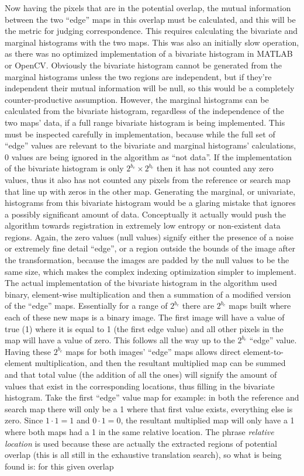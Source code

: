 Now having the pixels that are in the potential overlap, the mutual information between the two ``edge'' maps in this overlap must be calculated, and this will be the metric for judging correspondence. This requires calculating the bivariate and marginal histograms with the two maps. This was also an initially slow operation, as there was no optimized implementation of a bivariate histogram in MATLAB\textsuperscript{\textregistered} or OpenCV. Obviously the bivariate histogram cannot be generated from the marginal histograms unless the two regions are independent, but if they're independent their mutual information will be null, so this would be a completely counter-productive assumption. However, the marginal histograms can be calculated from the bivariate histogram, regardless of the independence of the two maps' data, if a full range bivariate histogram is being implemented. This must be inspected carefully in implementation, because while the full set of ``edge'' values are relevant to the bivariate and marginal histograms' calculations, 0 values are being ignored in the algorithm as ``not data''. If the implementation of the bivariate histogram is only $2^{b_{e}} \times 2^{b_{e}}$ then it has not counted any zero values, thus it also has not counted any pixels from the reference or search map that line up with zeros in the other map. Generating the marginal, or univariate, histograms from this bivariate histogram would be a glaring mistake that ignores a possibly significant amount of data. Conceptually it actually would push the algorithm towards registration in extremely low entropy or non-existent data regions. Again, the zero values (null values) signify either the presence of a noise or extremely fine detail ``edge'', or a region outside the bounds of the image after the transformation, because the images are padded by the null values to be the same size, which makes the complex indexing optimization simpler to implement. The actual implementation of the bivariate histogram in the algorithm used binary, element-wise multiplication and then a summation of a modified version of the ``edge'' maps. Essentially for a range of $2^{b_{e}}$ there are $2^{b_{e}}$ maps built where each of these new maps is a binary image. The first image will have a value of true (1) where it is equal to 1 (the first edge value) and all other pixels in the map will have a value of zero. This follows all the way up to the $2^{b_{e}}$ ``edge'' value. Having these $2^{b_{e}}$ maps for both images' ``edge'' maps allows direct element-to-element multiplication, and then the resultant multiplied map can be summed and that total value (the addition of all the ones) will signify the amount of values that exist in the corresponding locations, thus filling in the bivariate histogram. Take the first ``edge'' value map for example: in both the reference and search map there will only be a 1 where that first value exists, everything else is zero. Since $1\cdot1=1$ and $0\cdot1=0$, the resultant multiplied map will only have a 1 where both maps had a 1 in the same relative location. The phrase \textit{relative location} is used because these are actually the extracted regions of potential overlap (this is all still in the exhaustive translation search), so what is being found is: for this given overlap 